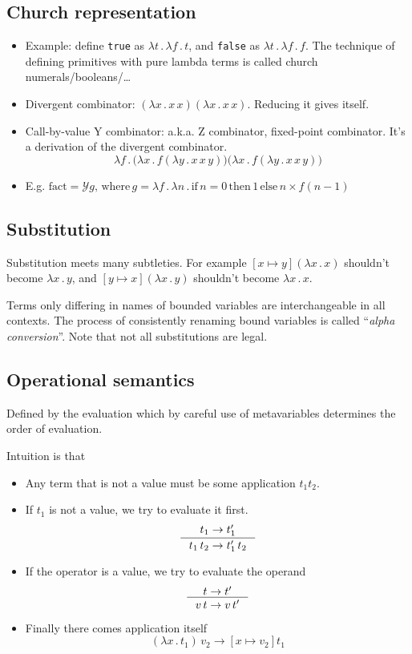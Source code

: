 \documentclass{article}
\begin{document}
\subsection{Church representation}
  \begin{itemize}
    \item Example: define \texttt{true} as $\lambda t\, .\, \lambda f\, .\, t$, and \texttt{false} as $\lambda t\, .\, \lambda f\, .\, f$.
      The technique of defining primitives with pure lambda terms is called church numerals/booleans/\ldots
    \item Divergent combinator: $(\lambda x \,.\, x \, x) (\lambda x \, .\, x \, x)$. Reducing it gives itself.
    \item Call-by-value Y combinator: a.k.a. Z combinator, fixed-point combinator. It's a derivation of the divergent combinator. \[
        \lambda f\, .\, \Big (\lambda x\, .\, f (\lambda y \, .\, x\, x\, y)\Big ) \Big (\lambda x\, .\, f (\lambda y \, .\, x\, x\, y)\Big )\]
    \item E.g. $\text{fact} = \mathcal{Y} g, \, \text{where}\, g = \lambda f\, .\, \lambda n\, .\, \text{if}\, n = 0 \, \text{then}\, 1 \, \text{else}\, n \times f(n-1)$
  \end{itemize}

\subsection{Substitution}
  Substitution meets many subtleties.
  For example $[x \mapsto y](\lambda x\, .\, x)$ shouldn't become $\lambda x\, .\, y$,
  and $[y \mapsto x](\lambda x\, .\, y)$ shouldn't become $\lambda x\, .\, x$.

  Terms only differing in names of bounded variables are interchangeable in all contexts.
  The process of consistently renaming bound variables is called ``\emph{alpha conversion}''.
  Note that not all substitutions are legal.

\subsection{Operational semantics}
  Defined by the evaluation which by careful use of metavariables determines the order of evaluation.

  Intuition is that \begin{itemize}
    \item Any term that is not a value must be some application $t_1 t_2$.
    \item If $t_1$ is not a value, we try to evaluate it first.\[
      \inference{t_1 \to t_1'}{t_1\,  t_2 \to t_1'\,  t_2}\]
    \item If the operator is a value, we try to evaluate the operand \[
      \inference{t \to t'}{v\,  t \to v\,  t'}\]
    \item Finally there comes application itself \[
      (\lambda x\, .\, t_1)\,  v_2 \to [x\mapsto v_2] t_1\]
  \end{itemize}
\end{document}

